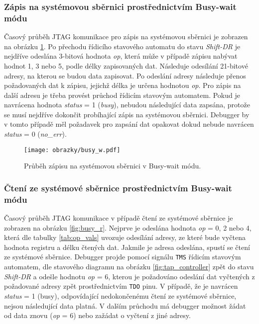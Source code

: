 \subsubsection{Zápis na systémovou sběrnici prostřednictvím Busy-wait módu} 
Časový průběh JTAG komunikace pro zápis na systémovou sběrnici je zobrazen na obrázku \ref{fig:busy_w}. Po přechodu řídicího stavového automatu do stavu \textit{Shift-DR} je nejdříve odeslána 3-bitová hodnota \textit{op}, která může v případě zápisu nabývat hodnot 1, 3 nebo 5, podle délky zapisovaných dat. Následuje odesílání 21-bitové adresy, na kterou se budou data zapisovat. Po odeslání adresy následuje přenos požadovaných dat k zápisu, jejichž délka je určena hodnotou \textit{op}. Pro zápis na další adresu je třeba provést průchod řídicím stavovým automatem. Pokud je navrácena hodnota \textit{status} = 1 (\textit{busy}), nebudou následující data zapsána, protože se musí nejdříve dokončit probíhající zápis na systémovou sběrnici. Debugger by v tomto případě měl požadavek pro zapsání dat opakovat dokud nebude navrácen \textit{status} = 0 (\textit{no\_err}).

\begin{figure}[H]
  \begin{center}
    \texttt{[image: obrazky/busy\_w.pdf]}
  \end{center}
  \caption{Průběh zápisu na systémovou sběrnici v Busy-wait módu.}
	\label{fig:busy_w}
\end{figure}

\subsubsection{Čtení ze systémové sběrnice prostřednictvím Busy-wait módu} 
Časový průběh JTAG komunikace v případě čtení ze systémové sběrnice je zobrazen na obrázku \ref{fig:busy_r}. Nejprve je odeslána hodnota \textit{op} = 0, 2 nebo 4, která dle tabulky \ref{tab:op_vals} uvozuje odesílání adresy, ze které bude vyčtena hodnota registru a délku čtených dat. Jakmile je adresa odeslána, spustí se čtení ze systémové sběrnice. Debugger projde pomocí signálu \texttt{\acs{TMS}} řídicím stavovým automatem, dle stavového diagramu na obrázku \ref{fig:tap_controller} zpět do stavu \textit{Shift-DR} a odešle hodnotu \textit{op} = 6, kterou je požadováno odeslání dat vyčtených z požadované adresy zpět prostřednictvím \texttt{\acs{TDO}} pinu. V případě, že je navrácen \textit{status} = 1 (busy), odpovídající nedokončenému čtení ze systémové sběrnice, nejsou následující data platná. V dalším průchodu má debugger možnost žádat od data znovu (\textit{op} = 6) nebo zažádat o vyčtení z jiné adresy.

